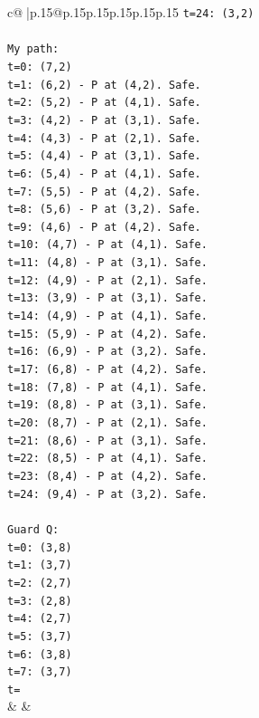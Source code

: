 \documentclass{article}
\begin{document}
{\begin{supertabular}{c@{$\;$}|p{.15\linewidth}@{}p{.15\linewidth}p{.15\linewidth}p{.15\linewidth}p{.15\linewidth}p{.15\linewidth}}
{{{\texttt{t=24: (3,2)} \\
\\ 
\texttt{My path:} \\
\texttt{t=0: (7,2)} \\
\texttt{t=1: (6,2) {-} P at (4,2). Safe.} \\
\texttt{t=2: (5,2) {-} P at (4,1). Safe.} \\
\texttt{t=3: (4,2) {-} P at (3,1). Safe.} \\
\texttt{t=4: (4,3) {-} P at (2,1). Safe.} \\
\texttt{t=5: (4,4) {-} P at (3,1). Safe.} \\
\texttt{t=6: (5,4) {-} P at (4,1). Safe.} \\
\texttt{t=7: (5,5) {-} P at (4,2). Safe.} \\
\texttt{t=8: (5,6) {-} P at (3,2). Safe.} \\
\texttt{t=9: (4,6) {-} P at (4,2). Safe.} \\
\texttt{t=10: (4,7) {-} P at (4,1). Safe.} \\
\texttt{t=11: (4,8) {-} P at (3,1). Safe.} \\
\texttt{t=12: (4,9) {-} P at (2,1). Safe.} \\
\texttt{t=13: (3,9) {-} P at (3,1). Safe.} \\
\texttt{t=14: (4,9) {-} P at (4,1). Safe.} \\
\texttt{t=15: (5,9) {-} P at (4,2). Safe.} \\
\texttt{t=16: (6,9) {-} P at (3,2). Safe.} \\
\texttt{t=17: (6,8) {-} P at (4,2). Safe.} \\
\texttt{t=18: (7,8) {-} P at (4,1). Safe.} \\
\texttt{t=19: (8,8) {-} P at (3,1). Safe.} \\
\texttt{t=20: (8,7) {-} P at (2,1). Safe.} \\
\texttt{t=21: (8,6) {-} P at (3,1). Safe.} \\
\texttt{t=22: (8,5) {-} P at (4,1). Safe.} \\
\texttt{t=23: (8,4) {-} P at (4,2). Safe.} \\
\texttt{t=24: (9,4) {-} P at (3,2). Safe.} \\
\\ 
\texttt{Guard Q:} \\
\texttt{t=0: (3,8)} \\
\texttt{t=1: (3,7)} \\
\texttt{t=2: (2,7)} \\
\texttt{t=3: (2,8)} \\
\texttt{t=4: (2,7)} \\
\texttt{t=5: (3,7)} \\
\texttt{t=6: (3,8)} \\
\texttt{t=7: (3,7)} \\
\texttt{t=} \\
            }
        }
    }
    & & \\ \\


\end{supertabular}}
\end{document}

